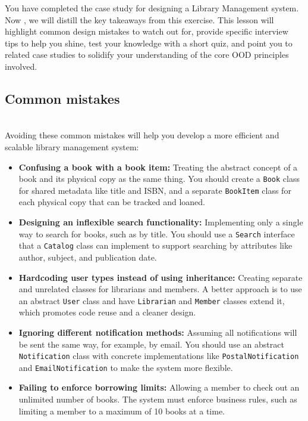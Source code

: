 

You have completed the case study for designing a Library Management system. Now , we will distill the key takeaways from this exercise. This lesson will highlight common design mistakes to watch out for, provide specific interview tips to help you shine, test your knowledge with a short quiz, and point you to related case studies to solidify your understanding of the core OOD principles involved.

\subsection{Common mistakes}\label{5UndwgU2b8b_JXtd7VQUN}
\\
Avoiding these common mistakes will help you develop a more efficient and scalable library management system:

\begin{itemize}
\item
\protect{}\label{Rux5DGrBVtNpa920Akx2s}
\textbf{Confusing a book with a book item:} Treating the abstract concept of a book and its physical copy as the same thing. You should create a \texttt{Book} class for shared metadata like title and ISBN, and a separate \texttt{BookItem} class for each physical copy that can be tracked and loaned.
\item
\protect{}\label{nYrazTeUpa8OuqFAJKqcf}
\textbf{Designing an inflexible search functionality:} Implementing only a single way to search for books, such as by title. You should use a \texttt{Search} interface that a \texttt{Catalog} class can implement to support searching by attributes like author, subject, and publication date.
\item
\protect{}\label{66eVC9NI52I8_Zs5kxZlY}
\textbf{Hardcoding user types instead of using inheritance:} Creating separate and unrelated classes for librarians and members. A better approach is to use an abstract \texttt{User} class and have \texttt{Librarian} and \texttt{Member} classes extend it, which promotes code reuse and a cleaner design.
\item
\protect{}\label{z7dApnBosx3RE2_QoaZmo}
\textbf{Ignoring different notification methods:} Assuming all notifications will be sent the same way, for example, by email. You should use an abstract \texttt{Notification} class with concrete implementations like \texttt{PostalNotification} and \texttt{EmailNotification} to make the system more flexible.
\item
\protect{}\label{q_kYEXNpwGEiqASKxSvGS}
\textbf{Failing to enforce borrowing limits:} Allowing a member to check out an unlimited number of books. The system must enforce business rules, such as limiting a member to a maximum of 10 books at a time.
\end{itemize}

